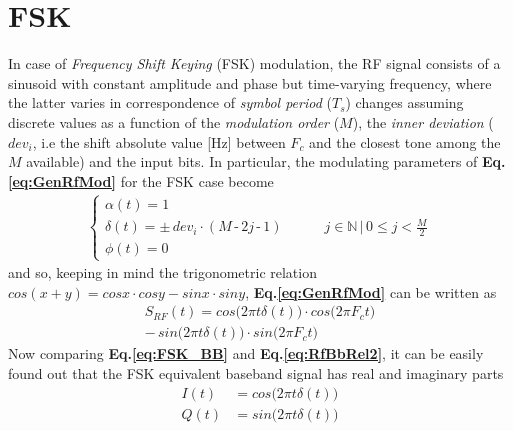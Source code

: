 \documentclass[twoside,twocolumn]{article}
\begin{document}

\section{FSK}
In case of \textit{Frequency Shift Keying} (FSK) modulation, the RF signal consists of a sinusoid with constant amplitude and phase but time-varying frequency, where the latter varies in correspondence of \textit{symbol period} ($T_s$) changes assuming discrete values as a function of the \textit{modulation order} ($M$), the \textit{inner deviation} ($dev_i$, i.e the shift absolute value [Hz] between $F_c$ and the closest tone among the $M$ available) and the input bits. In particular, the modulating parameters of \textbf{Eq.\ref{eq:GenRfMod}} for the FSK case become
\begin{align}
\left\{
\begin{array}{l} \nonumber
\alpha(t) = 1  \\[3pt]
\delta(t) = \pm \, \mathit{dev_i} \! \cdot \! \mathit{(M \, \text{-} \, 2j \, \text{-} \, 1)} \qquad \quad j \! \in \! \mathbb{N} \, | \, 0 \! \leq \! j \! < \! \frac{M}{2} \\[3pt]
\phi(t) = 0
\end{array}
\right.
\end{align}
and so, keeping in mind the trigonometric relation $cos(x\! +\!y) = cosx\cdot cosy-sinx\cdot siny$, \textbf{Eq.\ref{eq:GenRfMod}} can be written as
\begin{align}
S_{\mathit{RF}}(t) = cos\Big(2\pi t\delta(t)\Big)\! \cdot cos\Big(2\pi F_c t\Big) \label{eq:FSK_BB} \\
-\, sin\Big(2\pi t\delta(t)\Big)\! \cdot sin\Big(2\pi F_c t\Big) \nonumber
\end{align}
Now comparing \textbf{Eq.\ref{eq:FSK_BB}} and \textbf{Eq.\ref{eq:RfBbRel2}}, it can be easily found out that the FSK equivalent baseband signal has real and imaginary parts
\begin{align}
I(t) &= cos\Big(2\pi t\delta(t)\Big) \nonumber \\
Q(t) &= sin\Big(2\pi t\delta(t)\Big) \nonumber
\end{align}
\end{document}
